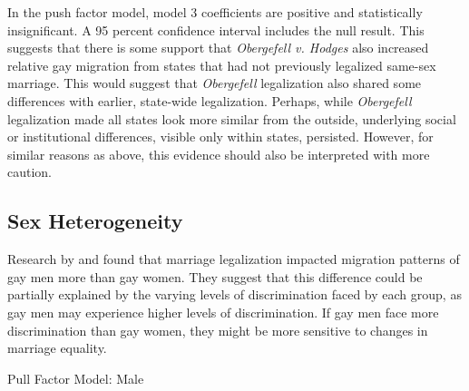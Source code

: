 \documentclass[12pt,letterpaper]{article}
\begin{document}
In the push factor model, model 3 coefficients are positive and statistically insignificant. A 95 percent confidence interval includes the null result. This suggests that there is some support that \textit{Obergefell v. Hodges} also increased relative gay migration from states that had not previously legalized same-sex marriage. This would suggest that \textit{Obergefell} legalization also shared some differences with earlier, state-wide legalization. Perhaps, while \textit{Obergefell} legalization made all states look more similar from the outside, underlying social or institutional differences, visible only within states, persisted. However, for similar reasons as above, this evidence should also be interpreted with more caution.

\clearpage
\subsection{Sex Heterogeneity}
Research by \citet{1} and \cite{12} found that marriage legalization impacted migration patterns of gay men more than gay women. They suggest that this difference could be partially explained by the varying levels of discrimination faced by each group, as gay men may experience higher levels of discrimination.  If gay men face more discrimination than gay women, they might be more sensitive to changes in marriage equality.

\begin{table}[htbp]
    \centering
    \caption{Pull Factor Model: Male}
    \label{tab: male_expost_model}
    
\end{table}
\end{document}
